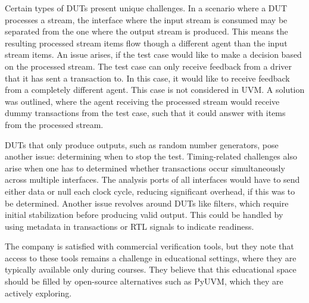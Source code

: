 \documentclass[12pt]{book}
\begin{document}
Certain types of DUTs present unique challenges. In a scenario where a DUT processes a stream, the interface where
the input stream is consumed may be separated from the one where the output stream is produced. This means the
resulting processed stream items flow though a different agent than the input stream items. An issue arises, if the
test case would like to make a decision based on the processed stream. The test case can only receive feedback from a
driver that it has sent a transaction to. In this case, it would like to receive feedback from a completely different
agent. This case is not considered in UVM. A solution was outlined, where the agent receiving the processed stream
would receive dummy transactions from the test case, such that it could answer with items from the processed stream.

DUTs that only produce outputs, such as random number generators, pose another issue: determining when to stop the
test. Timing-related challenges also arise when one has to determined whether transactions occur simultaneously
across multiple interfaces. The analysis ports of all interfaces would have to send either data or null each clock
cycle, reducing significant overhead, if this was to be determined. Another issue revolves around DUTs like filters,
which require initial stabilization before producing valid output. This could be handled by using metadata in
transactions or RTL signals to indicate readiness.

The company is satisfied with commercial verification tools, but they note that access to these tools remains a
challenge in educational settings, where they are typically available only during courses. They believe that this
educational space should be filled by open-source alternatives such as PyUVM, which they are actively exploring.
\end{document}
